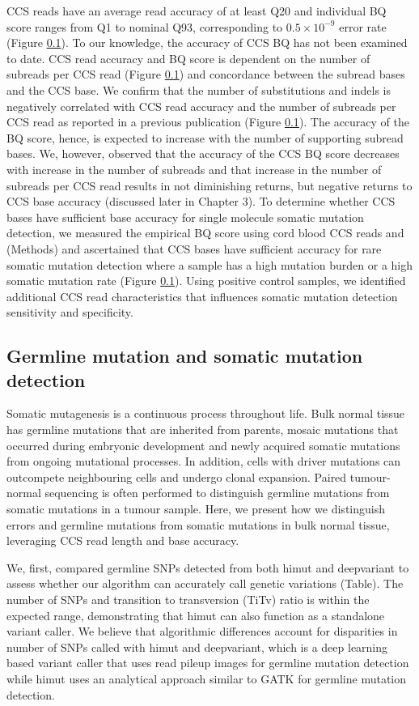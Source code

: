
CCS reads have an average read accuracy of at least Q20 and individual BQ score ranges from Q1 to nominal Q93, corresponding to $0.5\times10^{-9}$ error rate (Figure \ref{}). To our knowledge, the accuracy of CCS BQ has not been examined to date. CCS read accuracy and BQ score is dependent on the number of subreads per CCS read (Figure \ref{}) and concordance between the subread bases and the CCS base. We confirm that the number of substitutions and indels is negatively correlated with CCS read accuracy and the number of subreads per CCS read as reported in a previous publication (Figure \ref{}). The accuracy of the BQ score, hence, is expected to increase with the number of supporting subread bases. We, however, observed that the accuracy of the CCS BQ score decreases with increase in the number of subreads and that increase in the number of subreads per CCS read results in not diminishing returns, but negative returns to CCS base accuracy (discussed later in Chapter 3). To determine whether CCS bases have sufficient base accuracy for single molecule somatic mutation detection, we measured the empirical BQ score using cord blood CCS reads and (Methods) and ascertained that CCS bases have sufficient accuracy for rare somatic mutation detection where a sample has a high mutation burden or a high somatic mutation rate (Figure \ref{}). Using positive control samples, we identified additional CCS read characteristics that influences somatic mutation detection sensitivity and specificity. 

\subsection{Germline mutation and somatic mutation detection}

Somatic mutagenesis is a continuous process throughout life. Bulk normal tissue has germline mutations that are inherited from parents, mosaic mutations that occurred during embryonic development and newly acquired somatic mutations from ongoing mutational processes. In addition, cells with driver mutations can outcompete neighbouring cells and undergo clonal expansion. Paired tumour-normal sequencing is often performed to distinguish germline mutations from somatic mutations in a tumour sample. Here, we present how we distinguish errors and germline mutations from somatic mutations in bulk normal tissue, leveraging CCS read length and base accuracy. 

We, first, compared germline SNPs detected from both himut and deepvariant to assess whether our algorithm can accurately call genetic variations (Table). The number of SNPs and transition to transversion (TiTv) ratio is within the expected range, demonstrating that himut can also function as a standalone variant caller. We believe that algorithmic differences account for disparities in number of SNPs called with himut and deepvariant, which is a deep learning based variant caller that uses read pileup images for germline mutation detection while himut uses an analytical approach similar to GATK for germline mutation detection. 

